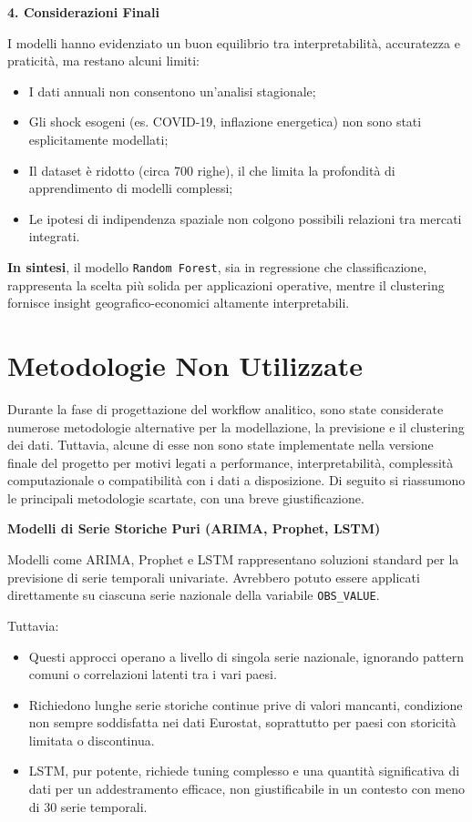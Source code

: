 \documentclass[conference]{IEEEtran}
\begin{document}
\vspace{1em}\noindent\textbf{4. Considerazioni Finali}

I modelli hanno evidenziato un buon equilibrio tra interpretabilità, accuratezza e praticità, ma restano alcuni limiti:

\begin{itemize}
  \item I dati annuali non consentono un’analisi stagionale;
  \item Gli shock esogeni (es. COVID-19, inflazione energetica) non sono stati esplicitamente modellati;
  \item Il dataset è ridotto (circa 700 righe), il che limita la profondità di apprendimento di modelli complessi;
  \item Le ipotesi di indipendenza spaziale non colgono possibili relazioni tra mercati integrati.
\end{itemize}

\textbf{In sintesi}, il modello \texttt{Random Forest}, sia in regressione che classificazione, rappresenta la scelta più solida per applicazioni operative, mentre il clustering fornisce insight geografico-economici altamente interpretabili.

\section*{\Large \textbf{Metodologie Non Utilizzate}}

Durante la fase di progettazione del workflow analitico, sono state considerate numerose metodologie alternative per la modellazione, la previsione e il clustering dei dati. Tuttavia, alcune di esse non sono state implementate nella versione finale del progetto per motivi legati a performance, interpretabilità, complessità computazionale o compatibilità con i dati a disposizione. Di seguito si riassumono le principali metodologie scartate, con una breve giustificazione.

\vspace{1em}\noindent\textbf{Modelli di Serie Storiche Puri (ARIMA, Prophet, LSTM)}

Modelli come ARIMA, Prophet e LSTM rappresentano soluzioni standard per la previsione di serie temporali univariate. Avrebbero potuto essere applicati direttamente su ciascuna serie nazionale della variabile \texttt{OBS\_VALUE}.

Tuttavia:
\begin{itemize}
    \item Questi approcci operano a livello di singola serie nazionale, ignorando pattern comuni o correlazioni latenti tra i vari paesi.
    \item Richiedono lunghe serie storiche continue prive di valori mancanti, condizione non sempre soddisfatta nei dati Eurostat, soprattutto per paesi con storicità limitata o discontinua.
    \item LSTM, pur potente, richiede tuning complesso e una quantità significativa di dati per un addestramento efficace, non giustificabile in un contesto con meno di 30 serie temporali.
\end{itemize}
\end{document}
